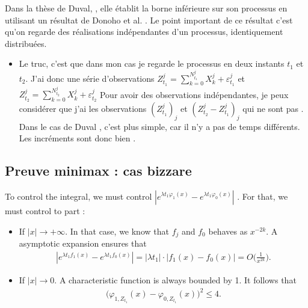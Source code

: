 \begin{question} Dans la thèse de Duval, 
\cite{duval2013density}, elle établit la borne inférieure sur son processus en utilisant un résultat de Donoho et al. \cite[Théorème 2]{donoho1996density}. Le point important de ce résultat c'est qu'on regarde des réalisations indépendantes d'un processus, identiquement distribuées. 
    \begin{itemize}
        \item Le truc, c'est que dans mon cas je regarde le processus en deux instants $t_1$ et $t_2$. J'ai donc une série d'observations $Z_{t_1}^j = \sum\limits_{k = 0}^{N_{t_1}^j} X_k^j + \varepsilon_{t_1}^j$ et $Z_{t_2}^j =  \sum\limits_{k = 0}^{N_{t_2}^j} X_k^j + \varepsilon_{t_2}^j$ 
        Pour avoir des observations indépendantes, je peux considérer que j'ai les observations 
        $(Z_{t_1}^j)_j$ et $(Z_{t_2}^j - Z_{t_1}^j)_j$ qui ne sont pas \iid. \\

        Dans le cas de Duval \cite{duval2013density}, c'est plus simple, car il n'y a pas de temps différents. Les incréments sont donc bien \iid. 
    \end{itemize}
\end{question}


\subsection{Preuve minimax : cas bizzare}


To control the integral, we must control $|e^{\lambda t_1 \varphi_1(x)} - e^{\lambda t_1 \varphi_0(x)}|$
. For that, we must control to part : 
\begin{itemize}
    \item If $|x| \to +\infty$. In that case, we know that $f_j$ and $f_0$ behaves as $x^{-2k}$.
    A asymptotic expansion ensures that
    \begin{align*}
        |e^{\lambda t_1 f_1(x)} - e^{\lambda t_1 f_0(x)}|
        = |
        \lambda t_1| \cdot |f_1(x) - f_0(x)| = O \Big(\frac{1}{x^{2k}} \Big). 
    \end{align*}
    \item If $|x| \to 0$. A characteristic function is always bounded by 1. It follows that 
    \begin{align*} 
    \big(\varphi_{1, Z_{t_1}}(x) - \varphi_{0, Z_{t_1}}(x)\big)^2
    \leq 4. \\
    \end{align*}
    \end{itemize}

